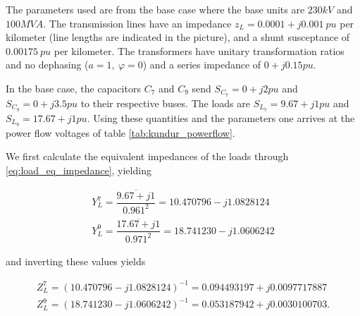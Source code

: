 	The parameters used are from the base case where the base units are $230kV$ and $100MVA$. The transmission lines have an impedance $z_L = 0.0001 + j0.001\ pu$ per kilometer (line lengths are indicated in the picture), and a shunt susceptance of $0.00175\ pu$ per kilometer. The transformers have unitary transformation ratios and no dephasing ($a = 1,\ \varphi = 0$) and a series impedance of $0 + j0.15pu$.

	In the base case, the capacitors $C_7$ and $C_9$ send $S_{C_7} = 0 + j2pu$ and $S_{C_9} = 0 + j3.5pu$ to their respective buses. The loads are $S_{L_7} = 9.67 + j1pu$ and $S_{L_9} = 17.67 + j1pu$. Using these quantities and the parameters one arrives at the power flow voltages of table \ref{tab:kundur_powerflow}.

\renewcommand{\arraystretch}{1.2}
\begin{table}[t]
\begin{center}
\end{center}
\caption{Power Flow results for Kundur two-area system of figure \ref{fig:kundur_2}.}
\label{tab:kundur_powerflow}
\end{table} %

	We first calculate the equivalent impedances of the loads through \eqref{eq:load_eq_impedance}, yielding

\begin{gather}
	Y_{L}^7 = \dfrac{\overline{9.67 + j1}}{0.961^2} = 10.470796 - j1.0828124 \\[5mm]
	Y_{L}^9 = \dfrac{\overline{17.67 + j1}}{0.971^2} = 18.741230 - j1.0606242
\end{gather}

	\noindent and inverting these values yields

\begin{gather}
	Z_{L}^7 = \left(10.470796 - j1.0828124\right)^{-1} = 0.094493197 + j0.0097717887 \\[5mm]
	Z_{L}^9 = \left(18.741230 - j1.0606242\right)^{-1} = 0.053187942 + j0.0030100703.
\end{gather}

